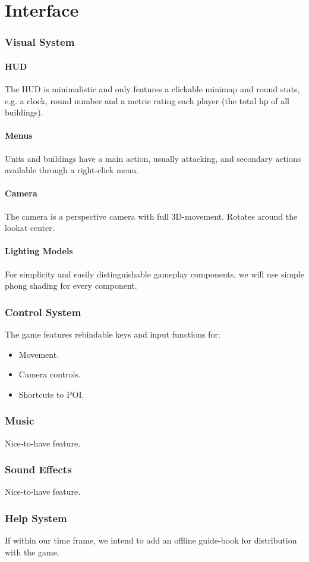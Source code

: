 \part{Interface}
\section{Visual System}
\subsection{HUD}
The HUD is minimalistic and only features a clickable minimap and round stats, e.g.
a clock, round number and a metric rating each player (the total hp of all buildings).
\subsection{Menus}
Units and buildings have a main action, usually attacking, and secondary actions available
through a right-click menu.
\subsection{Camera}
The camera is a perspective camera with full 3D-movement. Rotates around the lookat center.
\subsection{Lighting Models}
For simplicity and easily distinguishable gameplay components, we will use simple phong shading
for every component.
\section{Control System}
The game features rebindable keys and input functions for:

\begin{itemize}
    \item Movement.
    \item Camera controls.
    \item Shortcuts to POI.
\end{itemize}
\section{Music}
Nice-to-have feature.
\section{Sound Effects}
Nice-to-have feature.
\section{Help System}
If within our time frame, we intend to add an offline guide-book for distribution with the game.
